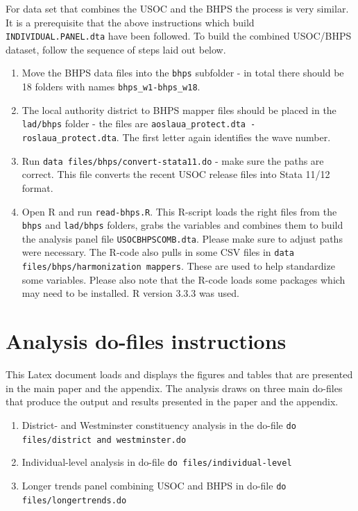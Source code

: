\documentclass[[a4paper,11pt]{article}
\newcommand{\code}[1]{\texttt{#1}}
\begin{document}
For data set that combines the USOC and the BHPS the process is very similar. It is a prerequisite that the above instructions which build \code{INDIVIDUAL.PANEL.dta} have been followed.  To build the combined USOC/BHPS dataset, follow the sequence of steps laid out below.


\begin{enumerate}

\item Move the BHPS data files  into the \code{bhps} subfolder - in total there should be 18 folders with names \code{bhps\_w1-bhps\_w18}.

\item The local authority district to BHPS mapper files should be placed in the \code{lad/bhps} folder - the files are \code{aoslaua\_protect.dta - roslaua\_protect.dta}. The first letter again identifies the wave number.

\item Run \code{data files/bhps/convert-stata11.do} - make sure the paths are correct. This file converts the recent USOC release files into Stata 11/12 format. 

\item Open R and run \code{read-bhps.R}. This R-script loads the right files from the \code{bhps} and \code{lad/bhps} folders, grabs the variables and combines them to build the analysis panel file \code{USOCBHPSCOMB.dta}. Please make sure to adjust paths were necessary. The R-code also pulls in some CSV files in \code{data files/bhps/harmonization mappers}. These are used to help standardize some variables. Please also note that the R-code loads some packages which may need to be installed. R version 3.3.3 was used.

\end{enumerate}



\section{Analysis do-files instructions}
This Latex document loads and displays the figures and tables that are presented in the main paper and the appendix. The analysis draws on three main do-files that produce the output and results presented in the paper and the appendix. 

\begin{enumerate}

\item District- and Westminster constituency analysis in the do-file \code{do files/district and westminster.do}

\item Individual-level analysis in do-file \code{do files/individual-level}

\item Longer trends panel combining USOC and BHPS in do-file \code{do files/longertrends.do}

\end{enumerate}
\end{document}
